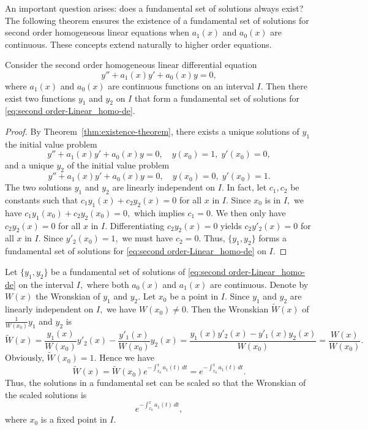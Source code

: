 An important question arises: does  a fundamental set of solutions always exist?   The following theorem ensures the existence of a fundamental set of solutions for  second order  homogeneous linear equations when  $a_1(x)$ and $a_0(x)$ are continuous. These concepts  extend naturally to higher order  equations.


\begin{theorem}\label{thm:existence of a fundamental set}
	Consider the second order  homogeneous linear  differential equation  
	\begin{equation}\label{eq:second order-Linear_homo-de}
	y'' + a_1(x)y' + a_0(x)y = 0,
	\end{equation}
	where \( a_1(x) \) and \( a_0(x) \) are continuous functions on an interval $I.$ Then there exist two functions $y_1$ and $y_2$ on $I$ that form a fundamental set of solutions for  \eqref{eq:second order-Linear_homo-de}.
\end{theorem}


\begin{proof} By Theorem~\ref{thm:existence-theorem}, there exists a unique solutions of $y_1$  the initial value problem
	\[
	y'' + a_1(x)y' + a_0(x)y = 0, \quad y(x_0) = 1,\; y'(x_0) = 0,
	\]
	and  a unique  $y_2$ of the initial value problem \[
	y'' + a_1(x)y' + a_0(x)y = 0, \quad y(x_0) = 0,\; y'(x_0) = 1.
	\]
	The two solutions $y_1$ and $y_2$ are linearly independent on $I.$ In fact, let $c_1, c_2$ be constants such that 
	$c_1y_1(x) + c_2y_2( x) = 0$ for all $x$ in $I.$ Since $x_0$ is in $I,$ we have
	$c_1y_1(x_0) + c_2y_2( x_0) = 0,$ which implies $c_1 =0$. We then only have $c_2y_2(x) = 0$ for all $x$ in $I.$  Differentiating $ c_2y_2( x) = 0$ yields $c_2 y'_2(x) = 0$ for all $x$ in $I.$ Since $y'_2(x_0) = 1,$ we must have $c_2 = 0.$
	Thus, \(\{y_1, y_2\}\) forms a fundamental set of solutions for   \eqref{eq:second order-Linear_homo-de} on $I.$
\end{proof}

  Let $\{y_1, y_2\}$ be a fundamental set of solutions of \eqref{eq:second order-Linear_homo-de} on the  interval $I,$ where both $a_0(x)$ and $a_1(x)$ are continuous.  Denote by $W(x)$  the Wronskian of \(y_1\) and  \(y_2\). Let $x_0$ be a point in $I.$ Since $y_1$ and $y_2$ are linearly independent on $I,$ we have
 $W(x_0)\ne 0.$ Then the Wronskian \(\widetilde{W}(x)\) of \(\frac{1}{ W(x_0)}y_1\) and \(y_2\)   is 
\[\widetilde{W}(x) =\frac{y_1(x) }{W(x_0)} y'_2(x) -\frac{y'_1(x) }{W(x_0)} y_2(x) = \frac{y_1(x) y'_2(x)- y'_1(x) y_2(x)}{W(x_0)} = \frac{W(x)}{W(x_0)}. \] 
Obviously, $\widetilde{W}(x_0)=1.$ Hence we have
\[\widetilde{W}(x) = \widetilde{W}(x_0) e^{-\int_{x_0}^x a_1(t)\, dt} =e^{-\int_{x_0}^x a_1(t)\, dt}.\]
Thus, the solutions in a fundamental set can be scaled  so that the Wronskian of the scaled solutions is 
\[e^{-\int_{x_0}^x a_1(t)\, dt},\]
where $x_0$ is a fixed point in $I.$

